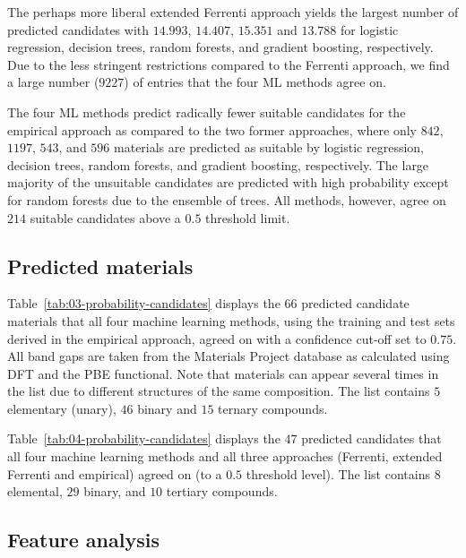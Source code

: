 \documentclass[superscriptaddress,unsortedaddress,
 amsmath,amssymb,
 aps,
]{revtex4-2}
\begin{document}
The perhaps more liberal extended Ferrenti approach yields the largest number of predicted candidates with $14.993$, $14.407$, $15.351$ and $13.788$ for logistic regression, decision trees, random forests, and gradient boosting, respectively. Due to the less stringent restrictions compared to the Ferrenti approach, we find a large number ($9227$) of entries that the four ML methods  agree on.

The four ML methods predict radically fewer suitable candidates for the empirical approach as compared to the two former approaches, where only $842$, $1197$, $543$, and $596$ materials are predicted as suitable by logistic regression, decision trees, random forests, and gradient boosting, respectively. The large majority of the unsuitable candidates are predicted with high probability except for random forests due to the ensemble of trees. All methods, however, agree on $214$ suitable candidates above a $0.5$ threshold limit.  

\subsection*{Predicted materials}

Table~\ref{tab:03-probability-candidates} displays the $66$ predicted candidate materials that all four machine learning methods, using the training and test sets derived in the empirical approach, agreed on with a confidence cut-off set to $0.75$. All band gaps are taken from the Materials Project database as calculated using DFT and the PBE functional. Note that materials can appear several times in the list due  to  different  structures of the same composition. The  list  contains $5$ elementary (unary), $46$ binary and  $15$ ternary compounds. 

\newpage 



Table~\ref{tab:04-probability-candidates} displays the $47$ predicted candidates that all four machine learning methods and all three approaches (Ferrenti, extended Ferrenti and empirical) agreed on (to a $0.5$ threshold level).    
The list contains $8$ elemental, $29$ binary, and $10$ tertiary compounds.



\subsection*{Feature analysis}
\end{document}
